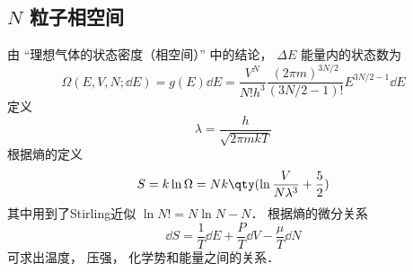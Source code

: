 
\begin{issues}
\issueDraft
\end{issues}

\subsection{$N$ 粒子相空间}

由 “理想气体的状态密度（相空间）” 中的结论， $\Delta E$ 能量内的状态数为
\begin{equation}
\Omega (E,V,N; \dd{E}) = g(E)\dd{E} = \frac{V^N}{N! h^3}\frac{(2\pi m)^{3N/2}}{(3N/2-1)!}E^{3N/2 - 1} \dd{E}
\end{equation}
定义
\begin{equation}
\lambda  = \frac{h}{\sqrt{2\pi mkT}}
\end{equation}
根据熵的定义%
\begin{equation}
S = k\ln \Omega  = Nk \qty(\ln \frac{V}{N\lambda^3} + \frac52)
\end{equation}
其中用到了Stirling近似%
$\ln N! = N\ln N - N$． 根据熵的微分关系
\begin{equation}
\dd{S} = \frac{1}{T} \dd{E} + \frac{P}{T} \dd{V} - \frac{\mu}{T} \dd{N}
\end{equation}
可求出温度， 压强， 化学势和能量之间的关系．
